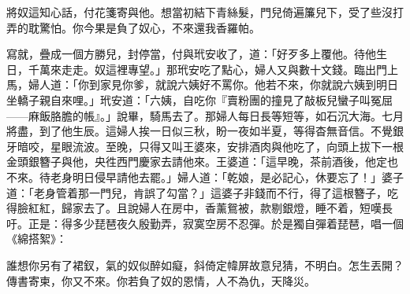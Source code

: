 \begin{myquote} 
將奴這知心話，付花箋寄與他。想當初結下青絲髮，門兒倚遍簾兒下，受了些沒打弄的耽驚怕。你今果是負了奴心，不來還我香羅帕。
\end{myquote} 

寫就，疊成一個方勝兒，封停當，付與玳安收了，道：「好歹多上覆他。待他生日，千萬來走走。奴這裡專望。」那玳安吃了點心，婦人又與數十文錢。臨出門上馬，婦人道：「你到家見你爹，就說六姨好不罵你。{}他若不來，你就說六姨到明日坐轎子親自來哩。」玳安道：「六姨，自吃你『賣粉團的撞見了敲板兒蠻子叫冤屈——麻飯胳膽的帳』。」{}說畢，騎馬去了。那婦人每日長等短等，如石沉大海。七月將盡，到了他生辰。這婦人挨一日似三秋，盼一夜如半夏，等得杳無音信。不覺銀牙暗咬，星眼流波。至晚，只得又叫王婆來，安排酒肉與他吃了，向頭上拔下一根金頭銀簪子與他，央徃西門慶家去請他來。王婆道：「這早晚，茶前酒後，他定也不來。待老身明日侵早請他去罷。」婦人道：「乾娘，是必記心，休要忘了！」婆子道：「老身管着那一門兒，{}肯誤了勾當？」這婆子非錢而不行，得了這根簪子，吃得臉紅紅，歸家去了。且說婦人在房中，香薰鴛被，款剔銀燈，睡不着，短嘆長吁。正是：得多少琵琶夜久殷勤弄，寂寞空房不忍彈。於是獨自彈着琵琶，唱一個《綿搭絮》：

\begin{myquote} 
誰想你另有了裙釵，氣的奴似醉如癡，斜倚定幃屏故意兒猜，不明白。怎生丟開？傳書寄柬，你又不來。你若負了奴的恩情，人不為仇，天降災。
\end{myquote} 

